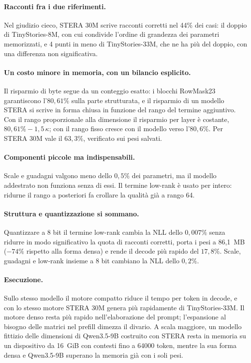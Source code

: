 \paragraph{Racconti fra i due riferimenti.} Nel giudizio cieco, STERA 30M scrive racconti corretti nel 44\% dei casi: il doppio di TinyStories-8M, con cui condivide l'ordine di grandezza dei parametri memorizzati, e 4 punti in meno di TinyStories-33M, che ne ha più del doppio, con una differenza non significativa.

\paragraph{Un costo minore in memoria, con un bilancio esplicito.} Il risparmio di byte segue da un conteggio esatto: i blocchi RowMask23 garantiscono l'$80{,}61\%$ sulla parte strutturata, e il risparmio di un modello STERA si scrive in forma chiusa in funzione del rango del termine aggiuntivo. Con il rango proporzionale alla dimensione il risparmio per layer è costante, $80{,}61\%-1{,}5\,\kappa$; con il rango fisso cresce con il modello verso l'$80{,}6\%$. Per STERA 30M vale il $63{,}3\%$, verificato sui pesi salvati.

\paragraph{Componenti piccole ma indispensabili.} Scale e guadagni valgono meno dello $0{,}5\%$ dei parametri, ma il modello addestrato non funziona senza di essi. Il termine low-rank è usato per intero: ridurne il rango a posteriori fa crollare la qualità già a rango 64.

\paragraph{Struttura e quantizzazione si sommano.} Quantizzare a 8 bit il termine low-rank cambia la NLL dello $0{,}007\%$ senza ridurre in modo significativo la quota di racconti corretti, porta i pesi a 86,1~MB ($-74\%$ rispetto alla forma densa) e rende il decode più rapido del $17{,}8\%$. Scale, guadagni e low-rank insieme a 8 bit cambiano la NLL dello $0{,}2\%$.

\paragraph{Esecuzione.} Sullo stesso modello il motore compatto riduce il tempo per token in decode, e con lo stesso motore STERA 30M genera più rapidamente di TinyStories-33M. Il motore denso resta più rapido nell'elaborazione del prompt; l'espansione al bisogno delle matrici nel prefill dimezza il divario. A scala maggiore, un modello fittizio delle dimensioni di Qwen3.5-9B costruito con STERA resta in memoria su un dispositivo da 16~GiB con contesti fino a \num{64000} token, mentre la sua forma densa e Qwen3.5-9B superano la memoria già con i soli pesi.

